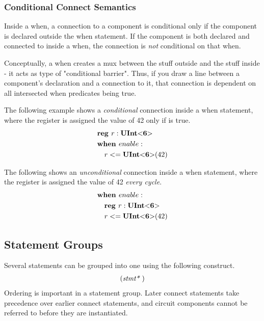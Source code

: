 \documentclass[12pt]{article}
\begin{document}
\subsubsection{Conditional Connect Semantics}
Inside a when, a connection to a component is conditional only if the component is declared outside the when statement.
If the component is both declared and connected to inside a when, the connection is {\em not} conditional on that when.

Conceptually, a when creates a mux between the stuff outside and the stuff inside - it acts as type of "conditional barrier".
Thus, if you draw a line between a component's declaration and a connection to it, that connection is dependent on all intersected when predicates being true.

The following example shows a {\em conditional} connection inside a when statement, where the register  is assigned the value of 42 only if  is true.
\[
\begin{aligned}
&\text{\bf reg\ } r : \text{\bf UInt}\text{\bf $<$} \text{\bf 6} \text{\bf $>$} \\
&\text{\bf when\ } enable : \\
&\quad r <= \text{\bf UInt}\text{\bf $<$} \text{\bf 6} \text{\bf $>$}(42) \\
\end{aligned}
\]

The following shows an {\em unconditional} connection inside a when statement, where the register  is assigned the value of 42 {\em every cycle}.
\[
\begin{aligned}
&\text{\bf when\ } enable : \\
&\quad \text{\bf reg\ } r : \text{\bf UInt}\text{\bf $<$} \text{\bf 6} \text{\bf $>$} \\
&\quad r <= \text{\bf UInt}\text{\bf $<$} \text{\bf 6} \text{\bf $>$}(42) \\
\end{aligned}
\]

\subsection{Statement Groups}
Several statements can be grouped into one using the following construct.
\[
\begin{aligned}
(\text{\em stmt*\ })
\end{aligned}
\]
Ordering is important in a statement group.
Later connect statements take precedence over earlier connect statements, and circuit components cannot be referred to before they are instantiated.
\end{document}
